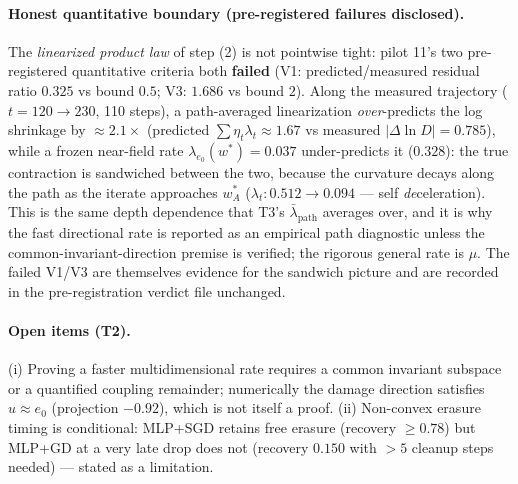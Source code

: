 \documentclass{article}
\newcommand{\lam}{\lambda}
\newcommand{\lampath}{\bar{\lam}_{\mathrm{path}}}
\begin{document}
\paragraph{Honest quantitative boundary (pre-registered failures disclosed).}
The \emph{linearized product law} of step (2) is not pointwise tight: pilot 11's two
pre-registered quantitative criteria both \textbf{failed} (V1: predicted/measured residual
ratio $0.325$ vs bound $0.5$; V3: $1.686$ vs bound $2$). Along the measured trajectory
($t=120{\to}230$, 110 steps), a path-averaged linearization \emph{over}-predicts the log
shrinkage by $\approx2.1\times$ (predicted $\sum\eta_t\lambda_t\approx1.67$ vs measured
$|\Delta\ln D|=0.785$), while a frozen near-field rate $\lam_{e_0}(w^*)=0.037$ under-predicts
it ($0.328$): the true contraction is sandwiched between the two, because the curvature decays
along the path as the iterate approaches $w^*_A$ ($\lambda_t: 0.512\to0.094$ --- self
\emph{de}celeration). This is the same depth dependence that T3's $\lampath$ averages over,
and it is why the fast directional rate is reported as an empirical path diagnostic unless the
common-invariant-direction premise is verified; the rigorous general rate is $\mu$. The
failed V1/V3 are themselves evidence for the sandwich picture and are recorded in the
pre-registration verdict file unchanged.

\paragraph{Open items (T2).} (i) Proving a faster multidimensional rate requires a common
invariant subspace or a quantified coupling remainder; numerically the damage direction
satisfies $u\approx e_0$ (projection $-0.92$), which is not itself a proof. (ii) Non-convex erasure timing is
conditional: MLP+SGD retains free erasure (recovery $\ge0.78$) but MLP+GD at a very late drop
does not (recovery $0.150$ with $>5$ cleanup steps needed) --- stated as a limitation.
\end{document}
